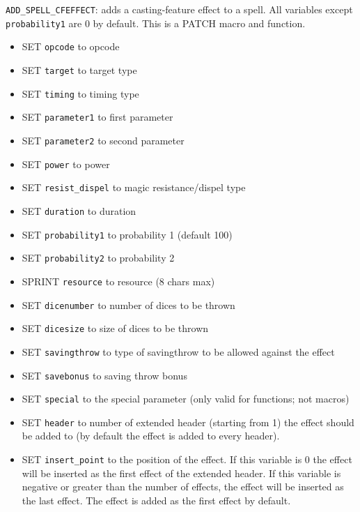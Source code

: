 \documentclass{article}
\begin{document}
\verb+ADD_SPELL_CFEFFECT+: adds a casting-feature effect to a spell. All variables except \verb+probability1+ are 0 by default.
This is a PATCH macro and function.
\begin{itemize}
\item SET \verb+opcode+ to opcode
\item SET \verb+target+ to target type
\item SET \verb+timing+ to timing type
\item SET \verb+parameter1+ to first parameter
\item SET \verb+parameter2+ to second parameter
\item SET \verb+power+ to power
\item SET \verb+resist_dispel+ to magic resistance/dispel type
\item SET \verb+duration+ to duration
\item SET \verb+probability1+ to probability 1 (default 100)
\item SET \verb+probability2+ to probability 2
\item SPRINT \verb+resource+ to resource (8 chars max)
\item SET \verb+dicenumber+ to number of dices to be thrown
\item SET \verb+dicesize+ to size of dices to be thrown
\item SET \verb+savingthrow+ to type of savingthrow to be allowed against the effect
\item SET \verb+savebonus+ to saving throw bonus
\item SET \verb+special+ to the special parameter (only valid for functions; not macros)
\item SET \verb+header+ to number of extended header (starting from 1) the effect should be added to (by default the effect is added to every header).
\item SET \verb+insert_point+ to the position of the effect. If this variable is 0 the effect will be inserted as the first effect of the extended header. If this variable is negative or greater than the number of effects, the effect will be inserted as the last effect. The effect is added as the first effect by default.
\end{itemize}
\end{document}
